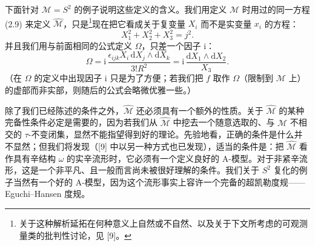 \documentclass[11pt,a4paper,UTF8]{ctexart}
\theoremstyle{plain}
\theoremstyle{definition}
\begin{document}
下面针对 $\mathcal{M}=S^2$ 的例子说明这些定义的含义。我们用定义 $\mathcal{M}$ 时用过的同一方程 (2.9) 来定义 $\widehat{\mathcal{M}}$，只是\footnote{关于这种解析延拓在何种意义上自然或不自然、以及关于下文所考虑的可观测量类的批判性讨论，见 [9]。}现在把它看成关于复变量 $X_i$ 而不是实变量 $x_i$ 的方程：
\begin{equation}
    X_1^2+X_2^2+X_3^2 = j^2 .
    \tag{2.18}
\end{equation}
并且我们用与前面相同的公式定义 $\Omega$，只差一个因子 $\mathrm{i}$：
\begin{equation}
    \Omega = \mathrm{i}\,\frac{\epsilon_{ijk}X_i\,\mathrm{d}X_j\wedge\mathrm{d}X_k}{3!R^2}
    = \mathrm{i}\,\frac{\mathrm{d}X_1\wedge\mathrm{d}X_2}{X_3}.
    \tag{2.19}
\end{equation}
（在 $\Omega$ 的定义中出现因子 $\mathrm{i}$ 只是为了方便；若我们把 $f$ 取作 $\Omega$（限制到 $\mathcal{M}$ 上）的虚部而非实部，则随后的公式会略微优雅一些。）


除了我们已经陈述的条件之外，$\widehat{\mathcal{M}}$ 还必须具有一个额外的性质。关于 $\widehat{\mathcal{M}}$ 的某种完备性条件必定是需要的，因为若我们从 $\widehat{\mathcal{M}}$ 中挖去一个随意选取的、与 $\mathcal{M}$ 不相交的 $\tau$-不变闭集，显然不能指望得到好的理论。先验地看，正确的条件是什么并不显然；但我们将发现（[9] 中以另一种方式也已发现），适当的条件是：把 $\widehat{\mathcal{M}}$ 看作具有辛结构 $\omega$ 的实辛流形时，它必须有一个定义良好的 A-模型。对于非紧辛流形，这是一个非平凡、且一般而言尚未被很好理解的条件。我们关于 $S^2$ 复化的例子当然有一个好的 A-模型，因为这个流形事实上容许一个完备的超凯勒度规——Eguchi–Hansen 度规。

\end{document}
